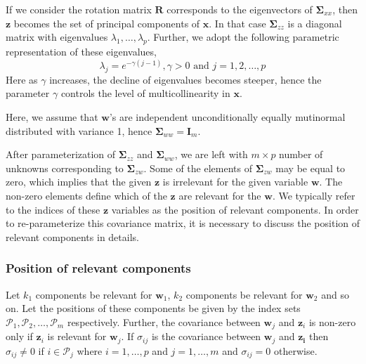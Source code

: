 \documentclass[12pt,A4paper,authoryear]{elsarticle} %
\providecommand{\tightlist}{%
  \setlength{\itemsep}{0pt}\setlength{\parskip}{0pt}}
\theoremstyle{definition}
\theoremstyle{definition}
\theoremstyle{remark}
\begin{document}
\begin{description}
\tightlist
\item[\textbf{Parameterization of \(\boldsymbol{\Sigma}_{zz}\)}]
If we consider the rotation matrix \(\mathbf{R}\) corresponds to the
eigenvectors of \(\boldsymbol{\Sigma}_{xx}\), then \(\mathbf{z}\)
becomes the set of principal components of \(\mathbf{x}\). In that case
\(\boldsymbol{\Sigma}_{zz}\) is a diagonal matrix with eigenvalues
\(\lambda_1, \ldots, \lambda_p\). Further, we adopt the following
parametric representation of these eigenvalues,
\[\lambda_j = e^{-\gamma(j - 1)}, \gamma >0 \text{ and } j = 1, 2, \ldots, p\]
Here as \(\gamma\) increases, the decline of eigenvalues becomes
steeper, hence the parameter \(\gamma\) controls the level of
multicollinearity in \(\mathbf{x}\).
\item[\textbf{Parameterization of \(\boldsymbol{\Sigma}_{ww}\)}]
Here, we assume that \(\mathbf{w}\)'s are independent unconditionally
equally mutinormal distributed with variance 1, hence
\(\boldsymbol{\Sigma}_{ww} = \mathbf{I}_m\).
\item[\textbf{Parameterization of \(\boldsymbol{\Sigma}_{zw}\)}]
After parameterization of \(\boldsymbol{\Sigma}_{zz}\) and
\(\boldsymbol{\Sigma}_{ww}\), we are left with \(m \times p\) number of
unknowns corresponding to \(\boldsymbol{\Sigma}_{zw}\). Some of the
elements of \(\boldsymbol{\Sigma}_{zw}\) may be equal to zero, which
implies that the given \(\mathbf{z}\) is irrelevant for the given
variable \(\mathbf{w}\). The non-zero elements define which of the
\(\mathbf{z}\) are relevant for the \(\mathbf{w}\). We typically refer
to the indices of these \(\mathbf{z}\) variables as the position of
relevant components. In order to re-parameterize this covariance matrix,
it is necessary to discuss the position of relevant components in
details.
\end{description}

\subsubsection{Position of relevant
components}\label{position-of-relevant-components}

Let \(k_1\) components be relevant for \(\mathbf{w}_1\), \(k_2\)
components be relevant for \(\mathbf{w}_2\) and so on. Let the positions
of these components be given by the index sets
\(\mathcal{P}_1, \mathcal{P}_2, \ldots, \mathcal{P}_m\) respectively.
Further, the covariance between \(\mathbf{w}_j\) and \(\mathbf{z}_i\) is
non-zero only if \(\mathbf{z}_i\) is relevant for \(\mathbf{w}_j\). If
\(\sigma_{ij}\) is the covariance between \(\mathbf{w}_j\) and
\(\mathbf{z_i}\) then \(\sigma_{ij} \ne 0\) if \(i \in \mathcal{P}_j\)
where \(i = 1, \ldots, p\) and \(j = 1, \ldots, m\) and
\(\sigma_{ij} = 0\) otherwise.
\end{document}
